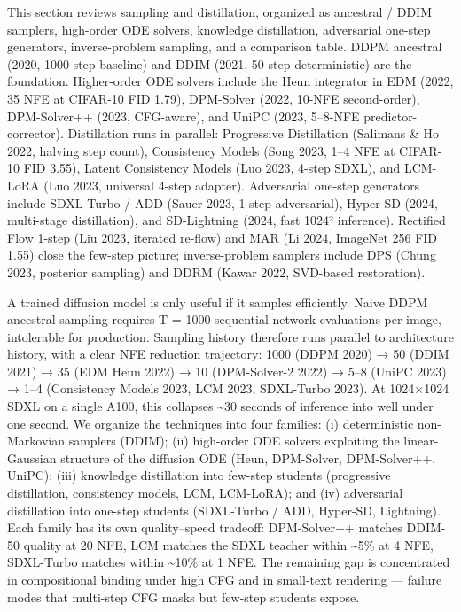 This section reviews sampling and distillation, organized as ancestral / DDIM samplers, high-order ODE solvers, knowledge distillation, adversarial one-step generators, inverse-problem sampling, and a comparison table. DDPM ancestral (2020, 1000-step baseline) and DDIM (2021, 50-step deterministic) are the foundation. Higher-order ODE solvers include the Heun integrator in EDM (2022, 35 NFE at CIFAR-10 FID 1.79), DPM-Solver (2022, 10-NFE second-order), DPM-Solver++ (2023, CFG-aware), and UniPC (2023, 5--8-NFE predictor-corrector). Distillation runs in parallel: Progressive Distillation (Salimans \& Ho 2022, halving step count), Consistency Models (Song 2023, 1--4 NFE at CIFAR-10 FID 3.55), Latent Consistency Models (Luo 2023, 4-step SDXL), and LCM-LoRA (Luo 2023, universal 4-step adapter). Adversarial one-step generators include SDXL-Turbo / ADD (Sauer 2023, 1-step adversarial), Hyper-SD (2024, multi-stage distillation), and SD-Lightning (2024, fast 1024² inference). Rectified Flow 1-step (Liu 2023, iterated re-flow) and MAR (Li 2024, ImageNet 256 FID 1.55) close the few-step picture; inverse-problem samplers include DPS (Chung 2023, posterior sampling) and DDRM (Kawar 2022, SVD-based restoration).

A trained diffusion model is only useful if it samples efficiently. Naive DDPM ancestral sampling requires T = 1000 sequential network evaluations per image, intolerable for production. Sampling history therefore runs parallel to architecture history, with a clear NFE reduction trajectory: 1000 (DDPM 2020) → 50 (DDIM 2021) → 35 (EDM Heun 2022) → 10 (DPM-Solver-2 2022) → 5--8 (UniPC 2023) → 1--4 (Consistency Models 2023, LCM 2023, SDXL-Turbo 2023). At 1024×1024 SDXL on a single A100, this collapses \textasciitilde30 seconds of inference into well under one second. We organize the techniques into four families: (i) deterministic non-Markovian samplers (DDIM); (ii) high-order ODE solvers exploiting the linear-Gaussian structure of the diffusion ODE (Heun, DPM-Solver, DPM-Solver++, UniPC); (iii) knowledge distillation into few-step students (progressive distillation, consistency models, LCM, LCM-LoRA); and (iv) adversarial distillation into one-step students (SDXL-Turbo / ADD, Hyper-SD, Lightning). Each family has its own quality--speed tradeoff: DPM-Solver++ matches DDIM-50 quality at 20 NFE, LCM matches the SDXL teacher within \textasciitilde5\% at 4 NFE, SDXL-Turbo matches within \textasciitilde10\% at 1 NFE. The remaining gap is concentrated in compositional binding under high CFG and in small-text rendering --- failure modes that multi-step CFG masks but few-step students expose.

